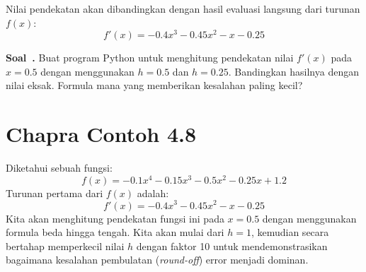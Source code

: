 \documentclass[a4paper,11pt,bahasa]{article} %
\newcounter{soal}%
\newenvironment{soal}[1][]{\refstepcounter{soal}\par\medskip
   \noindent \textbf{Soal~\thesoal. #1} \sffamily}{\medskip}
\begin{document}
Nilai pendekatan akan dibandingkan dengan hasil evaluasi langsung dari
turunan $f(x)$:
\begin{equation}
f'(x) = -0.4x^3 - 0.45x^2 - x - 0.25
\end{equation}

\begin{soal}
Buat program Python untuk menghitung pendekatan nilai $f'(x)$ pada $x=0.5$ dengan
menggunakan $h=0.5$ dan $h=0.25$. Bandingkan hasilnya dengan nilai eksak. Formula mana yang
memberikan kesalahan paling kecil?
\end{soal}


\section{Chapra Contoh 4.8}
Diketahui sebuah fungsi:
\begin{equation}
f(x) = -0.1x^4 - 0.15x^3 - 0.5x^2 - 0.25x + 1.2
\end{equation}
Turunan pertama dari $f(x)$ adalah:
\begin{equation}
f'(x) = -0.4x^3 - 0.45x^2 - x - 0.25
\end{equation}
Kita akan menghitung pendekatan fungsi ini pada $x=0.5$ dengan menggunakan
formula beda hingga tengah. Kita akan mulai dari $h=1$, kemudian secara bertahap
memperkecil nilai $h$ dengan faktor 10 untuk mendemonstrasikan bagaimana
kesalahan pembulatan (\textit{round-off}) error menjadi dominan.
\end{document}

